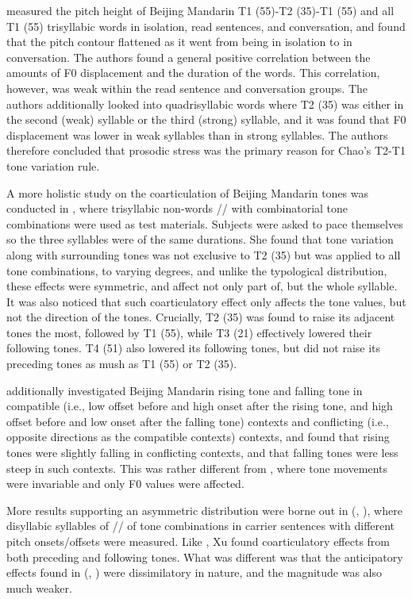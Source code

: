 \cite{ShihSproat1992} measured the pitch height of Beijing Mandarin T1 (55)-T2 (35)-T1 (55) and all T1 (55) trisyllabic words in isolation, read sentences, and conversation, and found that the pitch contour flattened as it went from being in isolation to in conversation. The authors found a general positive correlation between the amounts of F0 displacement and the duration of the words. This correlation, however, was weak within the read sentence and conversation groups. The authors additionally looked into quadrisyllabic words where T2 (35) was either in the second (weak) syllable or the third (strong) syllable, and it was found that F0 displacement was lower in weak syllables than in strong syllables. The authors therefore concluded that prosodic stress was the primary reason for Chao's T2-T1 tone variation rule.

A more holistic study on the coarticulation of Beijing Mandarin tones was conducted in \cite{Shen1990}, where trisyllabic non-words // with combinatorial tone combinations were used as test materials. Subjects were asked to pace themselves so the three syllables were of the same durations.  She found that tone variation along with surrounding tones was not exclusive to T2 (35) but was applied to all tone combinations, to varying degrees, and unlike the typological distribution, these effects were symmetric, and affect not only part of, but the whole syllable. It was also noticed that such coarticulatory effect only affects the tone values, but not the direction of the tones. Crucially, T2 (35) was found to raise its adjacent tones the most, followed by T1 (55), while T3 (21) effectively lowered their following tones. T4 (51) also lowered its following tones, but did not raise its preceding tones as mush as T1 (55) or T2 (35).

\cite{Xu1994} additionally investigated Beijing Mandarin rising tone and falling tone in compatible (i.e., low offset before and high onset after the rising tone, and high offset before and low onset after the falling tone) contexts and conflicting (i.e., opposite directions as the compatible contexts) contexts, and found that rising tones were slightly falling in conflicting contexts, and that falling tones were less steep in such contexts. This was rather different from \cite{Shen1990}, where tone movements were invariable and only F0 values were affected.

More results supporting an asymmetric distribution were borne out in \citeauthor{Xu1994a} (\citeyear{Xu1994a}, \citeyear{Xu1997}), where disyllabic syllables of // of tone combinations in carrier sentences with different pitch onsets/offsets were measured. Like \cite{Shen1990}, Xu found coarticulatory effects from both preceding and following tones. What was different was that the anticipatory effects found in \citeauthor{Xu1994a} (\citeyear{Xu1994a}, \citeyear{Xu1997}) were dissimilatory in nature, and the magnitude was also much weaker.

